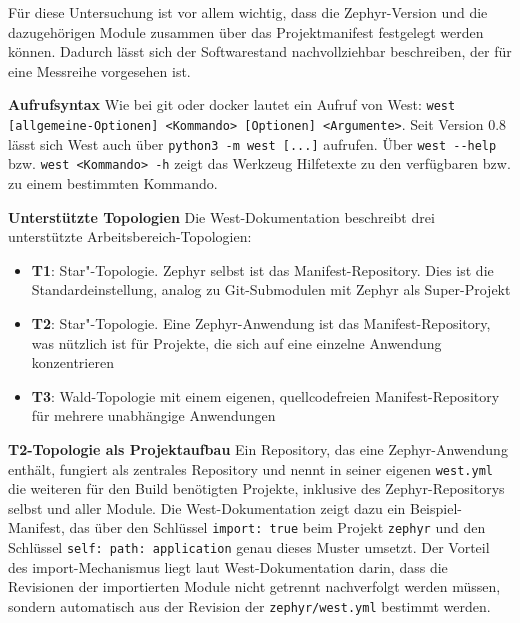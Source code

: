 F{\"u}r diese Untersuchung ist vor allem wichtig, dass die Zephyr-Version und die dazugeh{\"o}rigen Module zusammen {\"u}ber das Projektmanifest festgelegt werden k{\"o}nnen. Dadurch l{\"a}sst sich der Softwarestand nachvollziehbar beschreiben, der f{\"u}r eine Messreihe vorgesehen ist.

\textbf{Aufrufsyntax} Wie bei git oder docker lautet ein Aufruf von West: \lstinline[style=codeinline]|west [allgemeine-Optionen] <Kommando> [Optionen] <Argumente>|. Seit Version 0.8 l{\"a}sst sich West auch {\"u}ber \lstinline[style=codeinline]|python3 -m west [...]| aufrufen. {\"U}ber \lstinline[style=codeinline]|west --help| bzw. \lstinline[style=codeinline]|west <Kommando> -h| zeigt das Werkzeug Hilfetexte zu den verf{\"u}gbaren bzw. zu einem bestimmten Kommando.

\textbf{Unterst{\"u}tzte Topologien} Die West-Dokumentation beschreibt drei unterst{\"u}tzte Arbeitsbereich-Topologien:

\begin{itemize}
\item \textbf{T1}: \glqq{}Star"-Topologie. Zephyr selbst ist das Manifest-Repository. Dies ist die Standardeinstellung, analog zu Git-Submodulen mit Zephyr als Super-Projekt
\item \textbf{T2}: \glqq{}Star"-Topologie. Eine Zephyr-Anwendung ist das Manifest-Repository, was n{\"u}tzlich ist f{\"u}r Projekte, die sich auf eine einzelne Anwendung konzentrieren
\item \textbf{T3}: Wald-Topologie mit einem eigenen, quellcodefreien Manifest-Repository f{\"u}r mehrere unabh{\"a}ngige Anwendungen
\end{itemize}
\textbf{T2-Topologie als Projektaufbau} Ein Repository, das eine Zephyr-Anwendung enth{\"a}lt, fungiert als zentrales Repository und nennt in seiner eigenen \lstinline[style=codeinline]|west.yml| die weiteren f{\"u}r den Build ben{\"o}tigten Projekte, inklusive des Zephyr-Repositorys selbst und aller Module. Die West-Dokumentation zeigt dazu ein Beispiel-Manifest, das {\"u}ber den Schl{\"u}ssel \lstinline[style=codeinline]|import: true| beim Projekt \lstinline[style=codeinline]|zephyr| und den Schl{\"u}ssel \lstinline[style=codeinline]|self: path: application| genau dieses Muster umsetzt. Der Vorteil des import-Mechanismus liegt laut West-Dokumentation darin, dass die Revisionen der importierten Module nicht getrennt nachverfolgt werden m{\"u}ssen, sondern automatisch aus der Revision der \lstinline[style=codeinline]|zephyr/west.yml| bestimmt werden.

